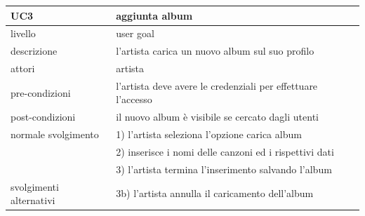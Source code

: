 \documentclass{article}
\begin{document}
  \begin{table}[H]
    \centering
    \begin{tabular}{|l|l|}
      \hline
      \textbf{UC3}            & \textbf{aggiunta album}                                      \\
      \hline
      livello                 & user goal                                                    \\
      \hline
      descrizione             & l'artista carica un nuovo album sul suo profilo              \\
      \hline
      attori                  & artista                                                      \\
      \hline
      pre-condizioni          & l'artista deve avere le credenziali per effettuare l'accesso \\
      \hline
      post-condizioni         & il nuovo album è visibile se cercato dagli utenti            \\
      \hline
      normale svolgimento     & 1) l'artista seleziona l'opzione carica album                \\
      & 2) inserisce i nomi delle canzoni ed i rispettivi dati       \\
      & 3) l'artista termina l'inserimento salvando l'album
      \\
      \hline
      svolgimenti alternativi & 3b) l'artista annulla il caricamento dell'album              \\
      \hline

    \end{tabular}
    \label{tab:uct3}
  \end{table}

  \vspace{40pt}
\end{document}
